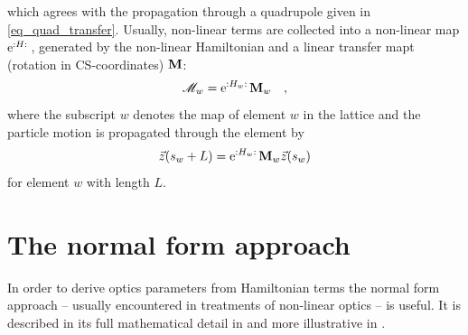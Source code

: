 which agrees with the propagation through a quadrupole given in \eqref{eq_quad_transfer}.
Usually, non-linear terms are collected into a non-linear map $\text{e}^{{:}H{:}\,}$, generated
by the non-linear Hamiltonian and a linear transfer mapt (rotation in CS-coordinates) $\mathbf{M}$:
%
\begin{equation}
    \mathscr{M}_w = \text{e}^{{:}H_w{:}\,} \mathbf{M}_w
    \quad ,
\end{equation}
%
where the subscript $w$ denotes the map of element $w$ in the lattice and the particle motion
is propagated through the element by
\begin{equation}
    \vec{z}(s_w + L) = \text{e}^{{:}H_w{:}\,} \mathbf{M}_w \vec{z}(s_w)
\end{equation}
for element $w$ with length $L$.
 


\section{The normal form approach}
\label{sec_normal_form}

In order to derive optics parameters from Hamiltonian terms the normal form approach
-- usually encountered in treatments of non-linear optics -- is useful.
It is described in its full mathematical detail in \cite{Bartolini1997,Bazzani1994}
and more illustrative in \cite{Tomas2005, Herr2013, Herr2020}.

